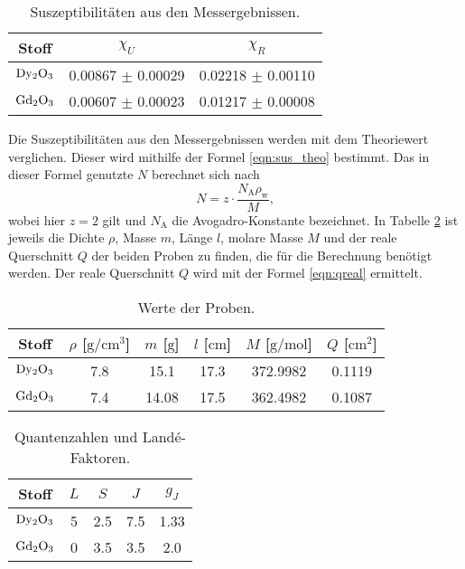 \begin{table}
  \centering
  \label{tab:Suszeptibilität_Praxis}
  \begin{tabular}{c c c}
    \toprule
    {Stoff} & {$\chi_U$} & {$\chi_R$} \\
    \midrule
    $\ce{Dy2O3}$ & 0.00867 $\pm$ 0.00029 & 0.02218 $\pm$ 0.00110 \\
    $\ce{Gd2O3}$ & 0.00607 $\pm$ 0.00023 & 0.01217 $\pm$ 0.00008 \\
    \bottomrule
  \end{tabular}
  \caption{Suszeptibilitäten aus den Messergebnissen.}
\end{table}
\noindent
Die Suszeptibilitäten aus den Messergebnissen werden mit dem Theoriewert verglichen.
Dieser wird mithilfe der Formel \eqref{eqn:sus_theo} bestimmt.
Das in dieser Formel genutzte $N$ berechnet sich nach
\begin{equation*}
  N = z \cdot \frac{N_{\text{A}} \rho_{\text{w}}}{M},
\end{equation*}
wobei hier $z = \num{2}$ gilt und $N_{\text{A}}$ die Avogadro-Konstante bezeichnet.
In Tabelle \ref{tab:Proben} ist jeweils die Dichte $\rho$, Masse $m$, Länge $l$, molare Masse $M$ und der reale Querschnitt $Q$ der beiden Proben zu finden, die für die Berechnung benötigt werden.
Der reale Querschnitt $Q$ wird mit der Formel \eqref{eqn:qreal} ermittelt.

\begin{table}
  \centering
  \label{tab:Proben}
  \begin{tabular}{c c c c c c }
    \toprule
    {Stoff} & {$\rho$ [$\si{\gram\per\centi\metre\cubed}$]} & {$m$ [$\si{\gram}$]} & {$l$ [$\si{\centi\metre}$]} & {$M$ [$\si{\gram\per\mole}$]} & {$Q$ [$\si{\centi\metre\squared}$]}\\
    \midrule
    $\ce{Dy2O3}$ & 7.8 & 15.1 & 17.3 & 372.9982 & 0.1119\\
    $\ce{Gd2O3}$ & 7.4 & 14.08 & 17.5 & 362.4982 & 0.1087\\
    \bottomrule
  \end{tabular}
  \caption{Werte der Proben.}
\end{table}

\begin{table}
  \centering
  \begin{tabular}{c c c c c }
    \toprule
    {Stoff} & {$L$} & {$S$} & {$J$} & {$g_J$}\\
    \midrule
    $\ce{Dy2O3}$ & 5 & 2.5 & 7.5 & 1.33\\
    $\ce{Gd2O3}$ & 0 & 3.5 & 3.5 & 2.0\\
    \bottomrule
  \end{tabular}
  \caption{Quantenzahlen und Landé-Faktoren.}
\end{table}

